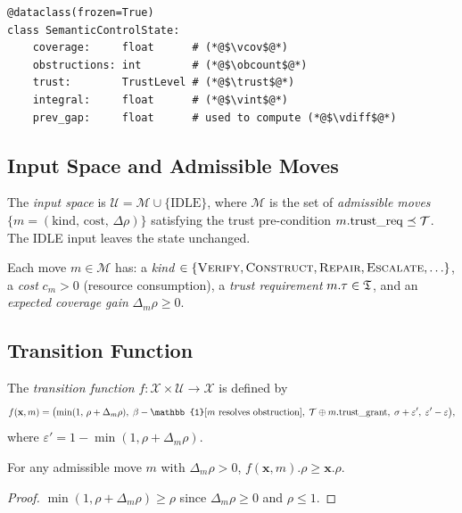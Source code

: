 \documentclass[11pt]{article}
\newcommand{\xstate}{\mathbf{x}}           %
\newcommand{\vcov}{\rho}                   %
\newcommand{\vgap}{\varepsilon}            %
\newcommand{\vint}{\sigma}                 %
\newcommand{\vdiff}{\delta}                %
\newcommand{\Xsp}{\mathcal{X}}            %
\newcommand{\Usp}{\mathcal{U}}            %
\newcommand{\obcount}{\beta}              %
\newcommand{\moves}{\mathcal{M}}           %
\begin{document}
\begin{lstlisting}[style=jugeo-python, caption={Core state type.}]
@dataclass(frozen=True)
class SemanticControlState:
    coverage:     float      # (*@$\vcov$@*)
    obstructions: int        # (*@$\obcount$@*)
    trust:        TrustLevel # (*@$\trust$@*)
    integral:     float      # (*@$\vint$@*)
    prev_gap:     float      # used to compute (*@$\vdiff$@*)
\end{lstlisting}

\subsection{Input Space and Admissible Moves}

\begin{definition}
  The \emph{input space} is
  $\Usp = \moves \cup \{\mathrm{IDLE}\}$,
  where $\moves$ is the set of \emph{admissible moves}
  $\{m = (\mathrm{kind},\,\mathrm{cost},\,\Delta\vcov)\}$
  satisfying the trust pre-condition $m.\mathrm{trust\_req} \preceq \mathcal{T}$.
  The \textsc{IDLE} input leaves the state unchanged.
\end{definition}

Each move $m \in \moves$ has:
a \emph{kind} $\in \{\textsc{Verify}, \textsc{Construct}, \textsc{Repair}, \textsc{Escalate}, \ldots\}$,
a \emph{cost} $c_m > 0$ (resource consumption),
a \emph{trust requirement} $m.\tau \in \mathfrak{T}$, and
an \emph{expected coverage gain} $\Delta_m \vcov \geq 0$.

\subsection{Transition Function}

\begin{definition}
  The \emph{transition function}
  $f : \Xsp \times \Usp \to \Xsp$ is defined by
  \[
    f(\xstate, m) = \bigl(
      \min(1,\,\vcov + \Delta_m\vcov),\;
      \obcount - \mathbb{1}[\text{$m$ resolves obstruction}],\;
      \trust \tjoin m.\mathrm{trust\_grant},\;
      \vint + \vgap',\;
      \vgap' - \vgap
    \bigr),
  \]
  where $\vgap' = 1 - \min(1, \vcov + \Delta_m\vcov)$.
\end{definition}

\begin{proposition}
  \label{prop:mono}
  For any admissible move $m$ with $\Delta_m\vcov > 0$,
  $f(\xstate, m).\vcov \geq \xstate.\vcov$.
\end{proposition}
\begin{proof}
  $\min(1, \vcov + \Delta_m\vcov) \geq \vcov$ since $\Delta_m\vcov \geq 0$
  and $\vcov \leq 1$.
\end{proof}
\end{document}
